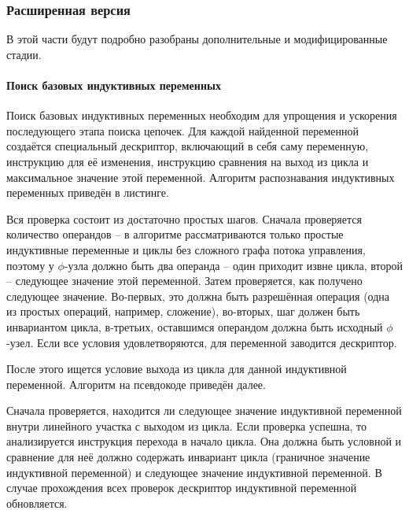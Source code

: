 \documentclass[12pt,a4paper]{article}
\begin{document}
\subsubsection{Расширенная версия}

\indent

В этой части будут подробно разобраны дополнительные и модифицированные стадии.

\paragraph{Поиск базовых индуктивных переменных}

Поиск базовых индуктивных переменных необходим для упрощения и ускорения последующего этапа поиска цепочек. Для каждой найденной переменной создаётся специальный дескриптор, включающий в себя саму переменную, инструкцию для её изменения, инструкцию сравнения на выход из цикла и максимальное значение этой переменной. Алгоритм распознавания индуктивных переменных приведён в листинге.



Вся проверка состоит из достаточно простых шагов. Сначала проверяется количество операндов -- в алгоритме рассматриваются только простые индуктивные переменные и циклы без сложного графа потока управления, поэтому у $\phi$-узла должно быть два операнда -- один приходит извне цикла, второй -- следующее значение этой переменной. Затем проверяется, как получено следующее значение. Во-первых, это должна быть разрешённая операция (одна из простых операций, например, сложение), во-вторых, шаг должен быть инвариантом цикла, в-третьих, оставшимся операндом должна быть исходный $\phi$-узел. Если все условия удовлетворяются, для переменной заводится дескриптор.

После этого ищется условие выхода из цикла для данной индуктивной переменной. Алгоритм на псевдокоде приведён далее.



Сначала проверяется, находится ли следующее значение индуктивной переменной внутри линейного участка с выходом из цикла. Если проверка успешна, то анализируется инструкция перехода в начало цикла. Она должна быть условной и сравнение для неё должно содержать инвариант цикла (граничное значение индуктивной переменной) и следующее значение индуктивной переменной. В случае прохождения всех проверок дескриптор индуктивной переменной обновляется.
\end{document}
